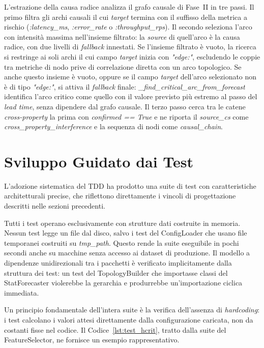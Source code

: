 L'estrazione della causa radice analizza il grafo causale di Fase~II in tre passi. Il primo
filtra gli archi causali il cui \textit{target} termina con il suffisso della metrica a
rischio (\textit{:latency\_ms}, \textit{:error\_rate} o \textit{:throughput\_rps}).
Il secondo seleziona l'arco con intensità massima nell'insieme filtrato: la \textit{source} di
quell'arco è la causa radice, con due livelli di \textit{fallback} innestati. Se l'insieme
filtrato è vuoto, la ricerca si restringe ai soli archi il cui campo \textit{target} inizia
con \textit{"edge:"}, escludendo le coppie tra metriche di nodo prive di correlazione
diretta con un arco topologico. Se anche questo insieme è vuoto, oppure se il campo
\textit{target} dell'arco selezionato non è di tipo \textit{"edge:"}, si attiva il
\textit{fallback} finale: \textit{\_find\_critical\_arc\_from\_forecast} identifica l'arco
critico come quello con il valore previsto più estremo al passo del \textit{lead time},
senza dipendere dal grafo causale. Il terzo passo cerca tra le catene \textit{cross-property}
la prima con \textit{confirmed == True} e ne riporta il \textit{source\_cs} come
\textit{cross\_property\_interference} e la sequenza di nodi come \textit{causal\_chain}.

\section{Sviluppo Guidato dai Test}
\label{sec:tdd}

L'adozione sistematica del \gls{TDD} ha prodotto una suite di test con caratteristiche
architetturali precise, che riflettono direttamente i vincoli di progettazione descritti nelle
sezioni precedenti.

Tutti i test operano esclusivamente con strutture dati costruite in memoria. Nessun test legge un
file dal disco, salvo i test del ConfigLoader che usano file temporanei costruiti su
\textit{tmp\_path}. Questo rende la suite eseguibile in pochi secondi anche su macchine senza
accesso ai dataset di produzione. Il modello a dipendenze unidirezionali tra i pacchetti è
verificato implicitamente dalla struttura dei test: un test del TopologyBuilder che importasse
classi del StatForecaster violerebbe la gerarchia e produrrebbe un'importazione ciclica immediata.

Un principio fondamentale dell'intera suite è la verifica dell'assenza di \textit{hardcoding}: i
test calcolano i valori attesi direttamente dalla configurazione caricata, non da costanti fisse
nel codice. Il Codice~\ref{lst:test_hcrit}, tratto dalla suite del FeatureSelector, ne fornisce
un esempio rappresentativo.

